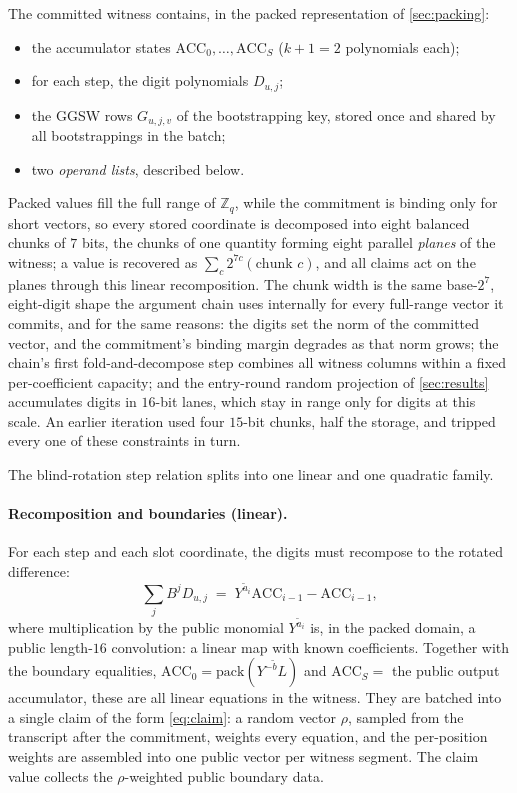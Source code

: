 \documentclass[11pt]{article}
\newcommand{\ZZ}{\mathbb{Z}}
\newcommand{\ACC}{\mathrm{ACC}}
\newcommand{\pack}{\mathrm{pack}}
\begin{document}
The committed witness contains, in the packed representation of \cref{sec:packing}:
\begin{itemize}
  \item the accumulator states $\ACC_0, \dots, \ACC_S$ ($k+1 = 2$ polynomials each);
  \item for each step, the digit polynomials $D_{u,j}$;
  \item the GGSW rows $G_{u,j,v}$ of the bootstrapping key, stored once and shared by all bootstrappings in the batch;
  \item two \emph{operand lists}, described below.
\end{itemize}
Packed values fill the full range of $\ZZ_q$, while the commitment is binding only for short vectors, so every stored coordinate is decomposed into eight balanced chunks of $7$ bits, the chunks of one quantity forming eight parallel \emph{planes} of the witness; a value is recovered as $\sum_c 2^{7c} (\text{chunk } c)$, and all claims act on the planes through this linear recomposition. The chunk width is the same base-$2^7$, eight-digit shape the argument chain uses internally for every full-range vector it commits, and for the same reasons: the digits set the norm of the committed vector, and the commitment's binding margin degrades as that norm grows; the chain's first fold-and-decompose step combines all witness columns within a fixed per-coefficient capacity; and the entry-round random projection of \cref{sec:results} accumulates digits in $16$-bit lanes, which stay in range only for digits at this scale. An earlier iteration used four $15$-bit chunks, half the storage, and tripped every one of these constraints in turn.

The blind-rotation step relation splits into one linear and one quadratic family.

\paragraph{Recomposition and boundaries (linear).} For each step and each slot coordinate, the digits must recompose to the rotated difference:
\[
  \textstyle\sum_j B^j D_{u,j} \;=\; Y^{\tilde a_i} \ACC_{i-1} - \ACC_{i-1},
\]
where multiplication by the public monomial $Y^{\tilde a_i}$ is, in the packed domain, a public length-$16$ convolution: a linear map with known coefficients. Together with the boundary equalities, $\ACC_0 = \pack(Y^{-\tilde b} L)$ and $\ACC_S = $ the public output accumulator, these are all linear equations in the witness. They are batched into a single claim of the form \eqref{eq:claim}: a random vector $\rho$, sampled from the transcript after the commitment, weights every equation, and the per-position weights are assembled into one public vector per witness segment. The claim value collects the $\rho$-weighted public boundary data.
\end{document}
